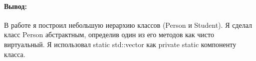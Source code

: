 \paragraph{Вывод:}
В работе я построил небольшую иерархию классов (Person и Student).
Я сделал класс Person абстрактным, определив один из его методов как чисто виртуальный.
Я использовал static std::vector как private static компоненту класса.